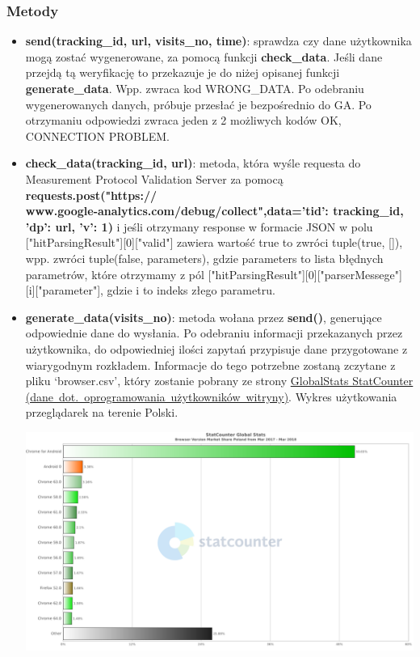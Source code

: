 \documentclass{article}
\begin{document}
\subsubsection{Metody}
\begin{itemize}
\item \textbf{send(tracking\_id, url, visits\_no, time)}: sprawdza czy dane użytkownika mogą zostać wygenerowane, za pomocą funkcji \textbf{check\_data}. Jeśli dane przejdą tą weryfikację to przekazuje je do niżej opisanej funkcji \textbf{generate\_data}. Wpp. zwraca kod WRONG\_DATA. Po odebraniu wygenerowanych danych, próbuje przesłać je bezpośrednio do GA\@. Po otrzymaniu odpowiedzi zwraca jeden z 2 możliwych kodów {OK, CONNECTION PROBLEM}.

\item \textbf{check\_data(tracking\_id, url)}: metoda, która wyśle requesta do Measurement Protocol Validation Server za pomocą \textbf{requests.post("https://\\www.google-analytics.com/debug/collect",data={'tid': tracking\_id, 'dp': url, 'v': 1})} i jeśli otrzymany response w formacie JSON w polu ["hitParsingResult"][0]["valid"] zawiera wartość true to zwróci tuple(true, []), wpp. zwróci tuple(false, parameters), gdzie parameters to lista błędnych parametrów, które otrzymamy z pól ["hitParsingResult"][0]["parserMessege"] [i]["parameter"], gdzie i to indeks złego parametru.

\item \textbf{generate\_data(visits\_no)}: metoda wołana przez \textbf{send()}, generujące odpowiednie dane do wysłania. Po odebraniu informacji przekazanych przez użytkownika, do odpowiedniej ilości zapytań przypisuje dane przygotowane z wiarygodnym rozkładem. Informacje do tego potrzebne zostaną zczytane z pliku `browser.csv', który zostanie pobrany ze strony \href{http://gs.statcounter.com/browser-version-market-share/all/poland#monthly-201703-201803-bar}{GlobalStats StatCounter (dane\ dot.\ oprogramowania\ użytkowników\ witryny)}. Wykres użytkowania przeglądarek na terenie Polski.

\begin{center}\includegraphics[scale=0.35]{chart}\end{center}
\end{itemize}
\end{document}
